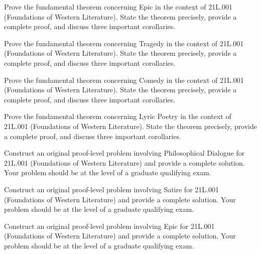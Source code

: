 \documentclass[12pt,a4paper]{exam}
\begin{document}
\begin{questions}

\question[4]
Prove the fundamental theorem concerning Epic in the context of 21L.001 (Foundations of Western Literature). State the theorem precisely, provide a complete proof, and discuss three important corollaries.

\vspace{0.3cm}

\question[4]
Prove the fundamental theorem concerning Tragedy in the context of 21L.001 (Foundations of Western Literature). State the theorem precisely, provide a complete proof, and discuss three important corollaries.

\vspace{0.3cm}

\question[2]
Prove the fundamental theorem concerning Comedy in the context of 21L.001 (Foundations of Western Literature). State the theorem precisely, provide a complete proof, and discuss three important corollaries.

\vspace{0.3cm}

\question[5]
Prove the fundamental theorem concerning Lyric Poetry in the context of 21L.001 (Foundations of Western Literature). State the theorem precisely, provide a complete proof, and discuss three important corollaries.

\vspace{0.3cm}

\question[4]
Construct an original proof-level problem involving Philosophical Dialogue for 21L.001 (Foundations of Western Literature) and provide a complete solution. Your problem should be at the level of a graduate qualifying exam.

\vspace{0.3cm}

\question[5]
Construct an original proof-level problem involving Satire for 21L.001 (Foundations of Western Literature) and provide a complete solution. Your problem should be at the level of a graduate qualifying exam.

\vspace{0.3cm}

\question[4]
Construct an original proof-level problem involving Epic for 21L.001 (Foundations of Western Literature) and provide a complete solution. Your problem should be at the level of a graduate qualifying exam.

\vspace{0.3cm}


\end{questions}
\end{document}
